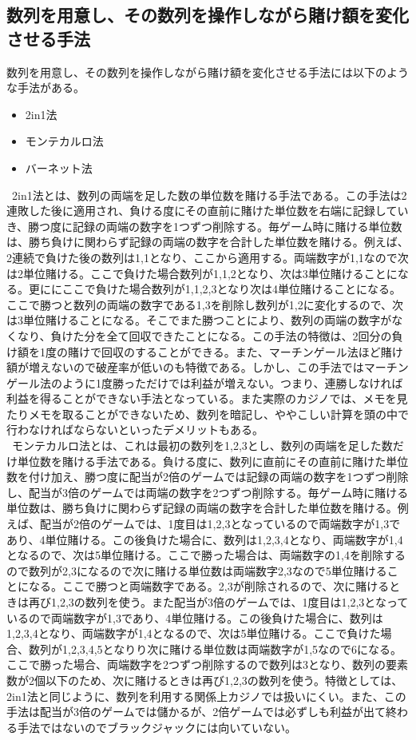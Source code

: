 \subsection{数列を用意し、その数列を操作しながら賭け額を変化させる手法}
 数列を用意し、その数列を操作しながら賭け額を変化させる手法には以下のような手法がある。
  \begin{itemize}
 \item 2in1法
 \item モンテカルロ法
 \item バーネット法
 \end{itemize}
\ 2in1法とは、数列の両端を足した数の単位数を賭ける手法である。この手法は2連敗した後に適用され、負ける度にその直前に賭けた単位数を右端に記録していき、勝つ度に記録の両端の数字を1つずつ削除する。毎ゲーム時に賭ける単位数は、勝ち負けに関わらず記録の両端の数字を合計した単位数を賭ける。例えば、2連続で負けた後の数列は{1,1}となり、ここから適用する。両端数字が1,1なので次は2単位賭ける。ここで負けた場合数列が{1,1,2}となり、次は3単位賭けることになる。更ににここで負けた場合数列が{1,1,2,3}となり次は4単位賭けることになる。ここで勝つと数列の両端の数字である1,3を削除し数列が{1,2}に変化するので、次は3単位賭けることになる。そこでまた勝つことにより、数列の両端の数字がなくなり、負けた分を全て回収できたことになる。この手法の特徴は、2回分の負け額を1度の賭けで回収のすることができる。また、マーチンゲール法ほど賭け額が増えないので破産率が低いのも特徴である。しかし、この手法ではマーチンゲール法のように1度勝っただけでは利益が増えない。つまり、連勝しなければ利益を得ることができない手法となっている。また実際のカジノでは、メモを見たりメモを取ることができないため、数列を暗記し、ややこしい計算を頭の中で行わなければならないといったデメリットもある。\\
\ モンテカルロ法とは、これは最初の数列を{1,2,3}とし、数列の両端を足した数だけ単位数を賭ける手法である。負ける度に、数列に直前にその直前に賭けた単位数を付け加え、勝つ度に配当が2倍のゲームでは記録の両端の数字を1つずつ削除し、配当が3倍のゲームでは両端の数字を2つずつ削除する。毎ゲーム時に賭ける単位数は、勝ち負けに関わらず記録の両端の数字を合計した単位数を賭ける。例えば、配当が2倍のゲームでは、1度目は{1,2,3}となっているので両端数字が1,3であり、4単位賭ける。この後負けた場合に、数列は{1,2,3,4}となり、両端数字が1,4となるので、次は5単位賭ける。ここで勝った場合は、両端数字の1,4を削除するので数列が{2,3}になるので次に賭ける単位数は両端数字2,3なので5単位賭けることになる。ここで勝つと両端数字である。2,3が削除されるので、次に賭けるときは再び{1,2,3}の数列を使う。また配当が3倍のゲームでは、1度目は{1,2,3}となっているので両端数字が1,3であり、4単位賭ける。この後負けた場合に、数列は{1,2,3,4}となり、両端数字が1,4となるので、次は5単位賭ける。ここで負けた場合、数列が{1,2,3,4,5}となりり次に賭ける単位数は両端数字が{1,5}なので6になる。ここで勝った場合、両端数字を2つずつ削除するので数列は{3}となり、数列の要素数が2個以下のため、次に賭けるときは再び{1,2,3}の数列を使う。特徴としては、2in1法と同じように、数列を利用する関係上カジノでは扱いにくい。また、この手法は配当が3倍のゲームでは儲かるが、2倍ゲームでは必ずしも利益が出て終わる手法ではないのでブラックジャックには向いていない。\\
